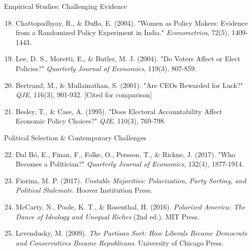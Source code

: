 \documentclass[10pt]{beamer}
\begin{document}
\begin{frame}{Empirical Studies: Challenging Evidence}
\footnotesize
\begin{enumerate}
\setcounter{enumi}{17}
\item Chattopadhyay, R., \& Duflo, E. (2004). "Women as Policy Makers: Evidence from a Randomized Policy Experiment in India." \emph{Econometrica}, 72(5), 1409-1443.
\item Lee, D. S., Moretti, E., \& Butler, M. J. (2004). "Do Voters Affect or Elect Policies?" \emph{Quarterly Journal of Economics}, 119(3), 807-859.
\item Bertrand, M., \& Mullainathan, S. (2001). "Are CEOs Rewarded for Luck?" \emph{QJE}, 116(3), 901-932. [Cited for comparison]
\item Besley, T., \& Case, A. (1995). "Does Electoral Accountability Affect Economic Policy Choices?" \emph{QJE}, 110(3), 769-798.
\end{enumerate}
\end{frame}

\begin{frame}{Political Selection \& Contemporary Challenges}
\footnotesize
\begin{enumerate}
\setcounter{enumi}{21}
\item Dal Bó, E., Finan, F., Folke, O., Persson, T., \& Rickne, J. (2017). "Who Becomes a Politician?" \emph{Quarterly Journal of Economics}, 132(4), 1877-1914.
\item Fiorina, M. P. (2017). \emph{Unstable Majorities: Polarization, Party Sorting, and Political Stalemate}. Hoover Institution Press.
\item McCarty, N., Poole, K. T., \& Rosenthal, H. (2016). \emph{Polarized America: The Dance of Ideology and Unequal Riches} (2nd ed.). MIT Press.
\item Levendusky, M. (2009). \emph{The Partisan Sort: How Liberals Became Democrats and Conservatives Became Republicans}. University of Chicago Press.
\end{enumerate}
\end{frame}
\end{document}
